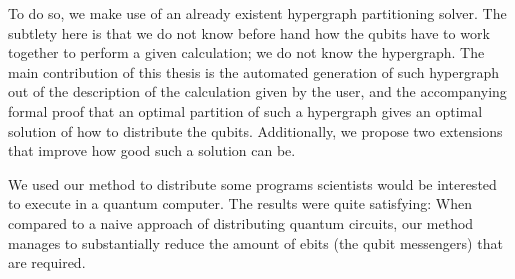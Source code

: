 To do so, we make use of an already existent hypergraph partitioning solver. The subtlety here is that we do not know before hand how the qubits have to work together to perform a given calculation; we do not know the hypergraph. The main contribution of this thesis is the automated generation of such hypergraph out of the description of the calculation given by the user, and the accompanying formal proof that an optimal partition of such a hypergraph gives an optimal solution of how to distribute the qubits. Additionally, we propose two extensions that improve how good such a solution can be. %

We used our method to distribute some programs scientists would be interested to execute in a quantum computer. The results were quite satisfying: When compared to a naive approach of distributing quantum circuits, our method manages to substantially reduce the amount of ebits (the qubit messengers) that are required.